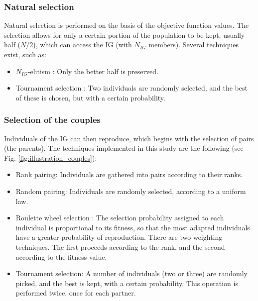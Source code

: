 \documentclass{ametsoc}
\begin{document}
\subsubsection{Natural selection}
\label{sec:gas:nat_selection}

Natural selection is performed on the basis of the objective function values. The selection allows for only a certain portion of the population to be kept, usually half ($N/2$), which can access the IG (with $N_{IG}$ members). Several techniques exist, such as:

\begin{itemize}
	\item $N_{IG}$-elitism \citep{Michalewicz1996}: Only the better half is preserved. 
	
	\item Tournament selection \citep{Michalewicz1996, Zitzler2004a}: Two individuals are randomly selected, and the best of these is chosen, but with a certain probability.
\end{itemize}


\subsubsection{Selection of the couples}
\label{sec:gas:selection_couples}

Individuals of the IG can then reproduce, which begins with the selection of pairs (the parents). The techniques implemented in this study are the following (see Fig. \ref{fig:illustration_couples}):


\begin{itemize}
	\item Rank pairing: Individuals are gathered into pairs according to their ranks.
	
	\item Random pairing: Individuals are randomly selected, according to a uniform law.
	
	\item Roulette wheel selection \citep{Goldberg1989}: The selection probability assigned to each individual is proportional to its fitness, so that the most adapted individuals have a greater probability of reproduction. There are two weighting techniques. The first proceeds according to the rank, and the second according to the fitness value.
	
	\item Tournament selection: A number of individuals (two or three) are randomly picked, and the best is kept, with a certain probability. This operation is performed twice, once for each partner.
\end{itemize}
\end{document}
